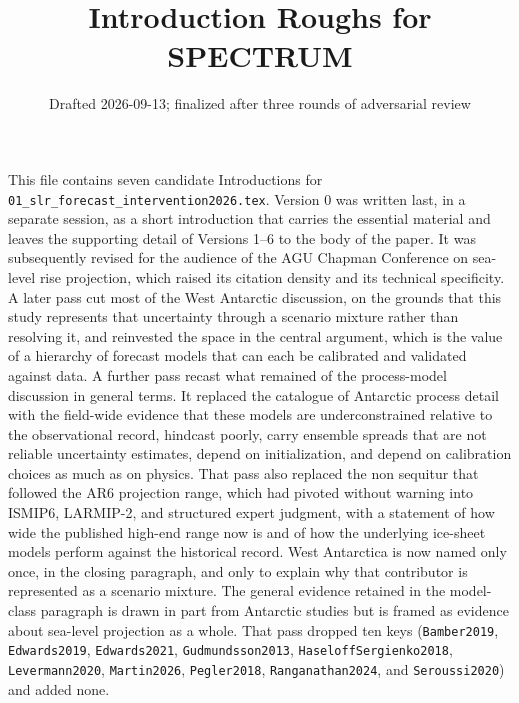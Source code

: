 \documentclass[12pt]{article}
\title{Introduction Roughs for SPECTRUM}
\author{}
\date{Drafted 2026-09-13; finalized after three rounds of adversarial review}
\begin{document}
\maketitle

\noindent This file contains seven candidate Introductions for
\texttt{01\_slr\_forecast\_intervention2026.tex}. Version 0 was written last,
in a separate session, as a short introduction that carries the essential
material and leaves the supporting detail of Versions 1--6 to the body of the
paper. It was subsequently revised for the audience of the AGU Chapman
Conference on sea-level rise projection, which raised its citation density and
its technical specificity. A later pass cut most of the West Antarctic
discussion, on the grounds that this study represents that uncertainty through
a scenario mixture rather than resolving it, and reinvested the space in the
central argument, which is the value of a hierarchy of forecast models that can
each be calibrated and validated against data. A further pass recast what
remained of the process-model discussion in general terms. It replaced the
catalogue of Antarctic process detail with the field-wide evidence that these
models are underconstrained relative to the observational record, hindcast
poorly, carry ensemble spreads that are not reliable uncertainty estimates,
depend on initialization, and depend on calibration choices as much as on
physics. That pass also replaced the non sequitur that followed the AR6
projection range, which had pivoted without warning into ISMIP6, LARMIP-2, and
structured expert judgment, with a statement of how wide the published high-end
range now is and of how the underlying ice-sheet models perform against the
historical record. West Antarctica is now named only once, in the closing
paragraph, and only to explain why that contributor is represented as a
scenario mixture. The general evidence retained in the model-class paragraph is
drawn in part from Antarctic studies but is framed as evidence about
sea-level projection as a whole. That pass dropped
ten keys (\texttt{Bamber2019}, \texttt{Edwards2019}, \texttt{Edwards2021},
\texttt{Gudmundsson2013}, \texttt{HaseloffSergienko2018},
\texttt{Levermann2020}, \texttt{Martin2026}, \texttt{Pegler2018},
\texttt{Ranganathan2024}, and \texttt{Seroussi2020}) and added none.
\end{document}
